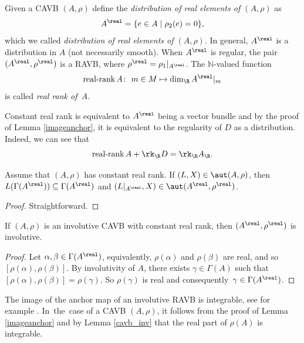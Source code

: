 \begin{Definition}
Given a CAVB $(A,\rho)$ define the {\em distribution of real elements of $(A,\rho)$} as
\[A^{\real} =\{e\in A\mid \rho_2(e)=0\},\]
which we called {\em distribution of real elements of $(A,\rho)$}. In general, $A^{\real}$ is a distribution in $A$ (not necessarily smooth). When $A^{\real}$ is regular, the pair $(A^{\real},\rho^{\real})$ is a RAVB, where $\rho^{\real}=\rho_1|_{A^{\real}}$. The $\mathbb{N}$-valued function %
\[\operatorname{\text{real-rank}} A\colon \ m\in M\mapsto \dim_{\R} A^{\real}|_m\]
is called {\em real rank of~$A$}.
\end{Definition}
Constant real rank is equivalent to $A^{\real}$ being a vector bundle and by the proof of Lemma \ref{imageanchor}, it is equivalent to the regularity of $D$ as a distribution. Indeed, we can see that
\begin{equation}\label{sum_identity}
  {\operatorname{\text{real-rank}} A}+\rk_{\R} D=\rk_{\R} A_{\R}.
\end{equation}
\begin{Lemma}\label{restriction_inf_aut}
   Assume that $(A,\rho)$ has constant real rank. If $(L,X)\in \aut(A,\rho)$, then $L(\Gamma(A^{\real}))\subseteq\Gamma(A^{\real})$ and $(L|_{A^{\real}}, X)\in \aut(A^{\real},\rho^{\real})$.
\end{Lemma}
\begin{proof}
  Straightforward.
\end{proof}

 \begin{Lemma}\label{cavb_inv}
 If $(A,\rho)$ is an involutive CAVB with constant real rank, then $(A^{\real}, \rho^{\real})$ is involutive.
 \end{Lemma}
\begin{proof}
Let $\alpha, \beta \in \Gamma (A^{\real})$, equivalently, $\rho (\alpha)$ and $\rho (\beta)$ are real, and so $[\rho (\alpha), \rho (\beta)]$. By involutivity of $A$, there exists $\gamma \in \Gamma (A)$ such that $[\rho (\alpha), \rho (\beta)]=\rho (\gamma)$. So $\rho (\gamma)$ is real and consequently~${\gamma\in \Gamma(A^{\real})}$.
\end{proof}


The image of the anchor map of an involutive RAVB is integrable, see for example \cite{bursztyn2019splitting}. In~the~case of a CAVB $(A,\rho)$, it follows from the proof of Lemma \ref{imageanchor} and by Lemma \ref{cavb_inv} that the real part of $\rho(A)$ is integrable.


